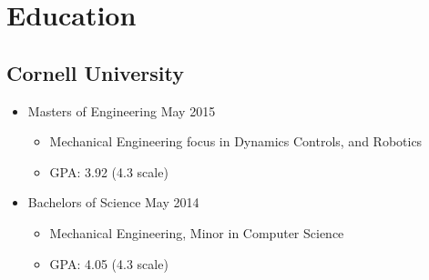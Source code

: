 \documentclass{BradyResume}
\begin{document}
\maketitle
\vspace*{-1ex}
\section*{Education}
\subsection*{Cornell University}
\begin{itemize}
\item Masters of Engineering 
\dotfill May 2015
  \begin{itemize}
      \item Mechanical Engineering focus in Dynamics Controls, and Robotics
      \item GPA: 3.92 (4.3 scale)
  \end{itemize}
\item Bachelors of Science 
\dotfill May 2014
  \begin{itemize}
  \item Mechanical Engineering, Minor in Computer Science
  \item GPA: 4.05 (4.3 scale)
  \end{itemize}
\end{itemize}
\end{document}
